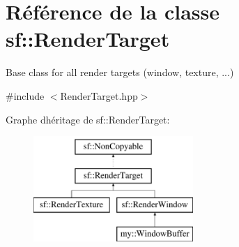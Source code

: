 \hypertarget{classsf_1_1RenderTarget}{}\section{Référence de la classe sf\+:\+:Render\+Target}
\label{classsf_1_1RenderTarget}


Base class for all render targets (window, texture, ...)  




{\ttfamily \#include $<$Render\+Target.\+hpp$>$}

Graphe d\textquotesingle{}héritage de sf\+:\+:Render\+Target\+:\begin{figure}[H]
\begin{center}
\leavevmode
\includegraphics[height=4.000000cm]{classsf_1_1RenderTarget}
\end{center}
\end{figure}
